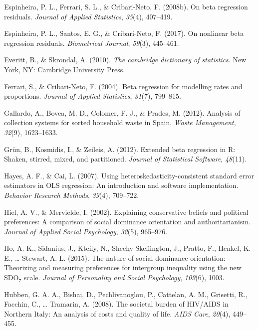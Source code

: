\documentclass[english,man]{apa6}
\newcounter{author}
\theoremstyle{definition}
\theoremstyle{definition}
\theoremstyle{remark}
\begin{document}
\hypertarget{ref-espinheira2008beta}{}
Espinheira, P. L., Ferrari, S. L., \& Cribari-Neto, F. (2008b). On beta
regression residuals. \emph{Journal of Applied Statistics},
\emph{35}(4), 407--419.

\hypertarget{ref-espinheira2017nonlinear}{}
Espinheira, P. L., Santos, E. G., \& Cribari-Neto, F. (2017). On
nonlinear beta regression residuals. \emph{Biometrical Journal},
\emph{59}(3), 445--461.

\hypertarget{ref-everitt2002cambridge}{}
Everitt, B., \& Skrondal, A. (2010). \emph{The cambridge dictionary of
statistics}. New York, NY: Cambridge University Press.

\hypertarget{ref-ferrari2004beta}{}
Ferrari, S., \& Cribari-Neto, F. (2004). Beta regression for modelling
rates and proportions. \emph{Journal of Applied Statistics},
\emph{31}(7), 799--815.

\hypertarget{ref-gallardo2012analysis}{}
Gallardo, A., Bovea, M. D., Colomer, F. J., \& Prades, M. (2012).
Analysis of collection systems for sorted household waste in Spain.
\emph{Waste Management}, \emph{32}(9), 1623--1633.

\hypertarget{ref-grun2012extended}{}
Grün, B., Kosmidis, I., \& Zeileis, A. (2012). Extended beta regression
in R: Shaken, stirred, mixed, and partitioned. \emph{Journal of
Statistical Software}, \emph{48}(11).

\hypertarget{ref-hayes2007using}{}
Hayes, A. F., \& Cai, L. (2007). Using heteroskedasticity-consistent
standard error estimators in OLS regression: An introduction and
software implementation. \emph{Behavior Research Methods}, \emph{39}(4),
709--722.

\hypertarget{ref-hiel2002explaining}{}
Hiel, A. V., \& Mervielde, I. (2002). Explaining conservative beliefs
and political preferences: A comparison of social dominance orientation
and authoritarianism. \emph{Journal of Applied Social Psychology},
\emph{32}(5), 965--976.

\hypertarget{ref-ho2015nature}{}
Ho, A. K., Sidanius, J., Kteily, N., Sheehy-Skeffington, J., Pratto, F.,
Henkel, K. E., \ldots{} Stewart, A. L. (2015). The nature of social
dominance orientation: Theorizing and measuring preferences for
intergroup inequality using the new SDO\(_7\) scale. \emph{Journal of
Personality and Social Psychology}, \emph{109}(6), 1003.

\hypertarget{ref-hubben2008societal}{}
Hubben, G. A. A., Bishai, D., Pechlivanoglou, P., Cattelan, A. M.,
Grisetti, R., Facchin, C., \ldots{} Tramarin, A. (2008). The societal
burden of HIV/AIDS in Northern Italy: An analysis of costs and quality
of life. \emph{AIDS Care}, \emph{20}(4), 449--455.
\end{document}
